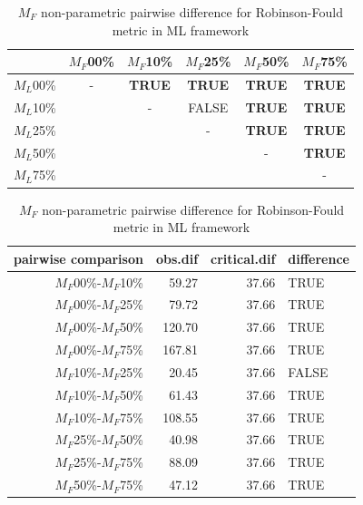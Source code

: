 \documentclass[12pt,letterpaper]{article}
\begin{document}
\begin{table}
\caption{$M_F$ non-parametric pairwise difference for Robinson-Fould metric in ML framework} %
\centering
\begin{tabular}{c|ccccc}
    \hline
              & $M_F$00\% & $M_F$10\% & $M_F$25\% & $M_F$50\% & $M_F$75\% \\
    \hline
    $M_L$00\% & - & \textbf{TRUE} & \textbf{TRUE} & \textbf{TRUE} & \textbf{TRUE}\\
    $M_L$10\% & & - & FALSE & \textbf{TRUE} & \textbf{TRUE} \\
    $M_L$25\% & & & - & \textbf{TRUE} & \textbf{TRUE} \\
    $M_L$50\% & & & & - & \textbf{TRUE} \\
    $M_L$75\% & & & & & - \\
    \hline
\end{tabular}
\centering
\begin{tabular}{rrrl}
 pairwise comparison & obs.dif & critical.dif & difference \\ 
  \hline
  $M_F$00\%-$M_F$10\% & 59.27 & 37.66 & TRUE \\ 
  $M_F$00\%-$M_F$25\% & 79.72 & 37.66 & TRUE \\ 
  $M_F$00\%-$M_F$50\% & 120.70 & 37.66 & TRUE \\ 
  $M_F$00\%-$M_F$75\% & 167.81 & 37.66 & TRUE \\ 
  $M_F$10\%-$M_F$25\% & 20.45 & 37.66 & FALSE \\ 
  $M_F$10\%-$M_F$50\% & 61.43 & 37.66 & TRUE \\ 
  $M_F$10\%-$M_F$75\% & 108.55 & 37.66 & TRUE \\ 
  $M_F$25\%-$M_F$50\% & 40.98 & 37.66 & TRUE \\ 
  $M_F$25\%-$M_F$75\% & 88.09 & 37.66 & TRUE \\ 
  $M_F$50\%-$M_F$75\% & 47.12 & 37.66 & TRUE \\ 
   \hline
\end{tabular}
\label{ML_RF-MF_results}
\end{table}
\end{document}
